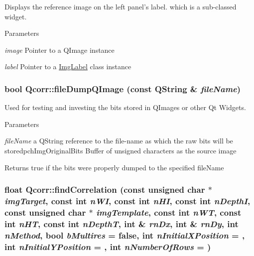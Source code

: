 Displays the reference image on the left panel's label. which is a sub-\/classed widget. 
\begin{DoxyParams}{Parameters}
\item[{\em image}]Pointer to a QImage instance \item[{\em label}]Pointer to a \hyperlink{classImgLabel}{ImgLabel} class instance \end{DoxyParams}
\hypertarget{classQcorr_a87229fc918fa4011e96fbadb325fd52e}{
\subsubsection[{fileDumpQImage}]{\setlength{\rightskip}{0pt plus 5cm}bool Qcorr::fileDumpQImage (const QString \& {\em fileName})}}
\label{classQcorr_a87229fc918fa4011e96fbadb325fd52e}


Used for testing and investing the bits stored in QImages or other Qt Widgets. 
\begin{DoxyParams}{Parameters}
\item[{\em fileName}]a QString reference to the file-\/name as which the raw bits will be storedpchImgOriginalBits Buffer of unsigned characters as the source image \end{DoxyParams}
\begin{DoxyReturn}{Returns}
true if the bits were properly dumped to the specified fileName 
\end{DoxyReturn}
\hypertarget{classQcorr_a05dcc1b0be4596b355df235264180da4}{
\subsubsection[{findCorrelation}]{\setlength{\rightskip}{0pt plus 5cm}float Qcorr::findCorrelation (const unsigned char $\ast$ {\em imgTarget}, \/  const int {\em nWI}, \/  const int {\em nHI}, \/  const int {\em nDepthI}, \/  const unsigned char $\ast$ {\em imgTemplate}, \/  const int {\em nWT}, \/  const int {\em nHT}, \/  const int {\em nDepthT}, \/  int \& {\em rnDx}, \/  int \& {\em rnDy}, \/  int {\em nMethod}, \/  bool {\em bMultires} = {\ttfamily false}, \/  int {\em nInitialXPosition} = {}, \/  int {\em nInitialYPosition} = {}, \/  int {\em nNumberOfRows} = {})}}
\label{classQcorr_a05dcc1b0be4596b355df235264180da4}


